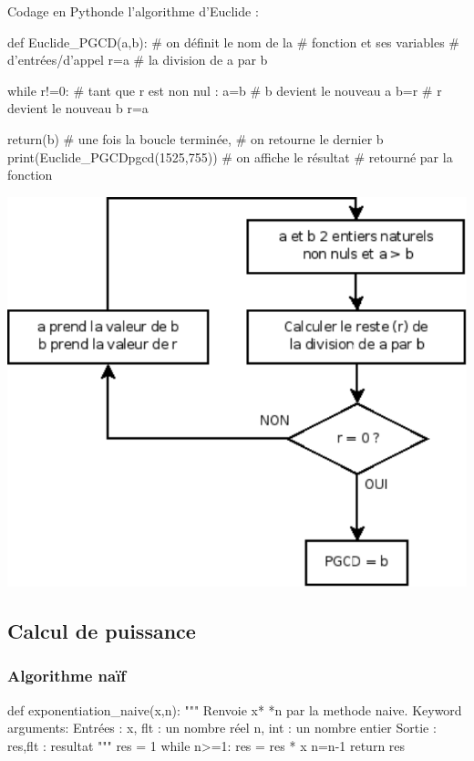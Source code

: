 \documentclass[10pt]{article}
\begin{document}
\begin{minipage}[c]{.48\linewidth}
\begin{py}
Codage en Pythonde l'algorithme d'Euclide :
\begin{python}
def Euclide_PGCD(a,b):	# on définit le nom de la 
			# fonction et ses variables 
			# d'entrées/d'appel
    r=a%
			# la division de a par b
    
    while r!=0:		# tant que r est non nul :
        a=b		# b devient le nouveau a
        b=r		# r devient le nouveau b
        r=a%
        
    return(b)		# une fois la boucle terminée, 
			# on retourne le dernier b    
print(Euclide_PGCDpgcd(1525,755))	
			# on affiche le résultat 
			# retourné par la fonction
\end{python}
\end{py}
\end{minipage}

\begin{center}
\includegraphics[width=.45\textwidth]{images/algo_euclide}
\end{center}
\subsection{Calcul de puissance}
\subsubsection{Algorithme naïf}

\begin{py}
\begin{python}
def exponentiation_naive(x,n):
    """
    Renvoie x* *n par la methode naive.
    Keyword arguments:
    Entrées : 
        x, flt : un nombre réel
        n, int : un nombre entier
    Sortie : 
        res,flt : resultat
    """
    res = 1
    while n>=1:
        res = res * x
        n=n-1
    return res
\end{python}
\end{py}
\end{document}
